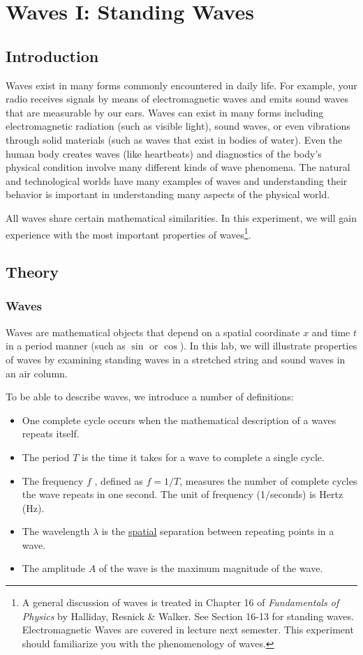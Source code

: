  \chapter{Waves I: Standing Waves}
\label{chap:waves}
\section{Introduction}
Waves exist in many forms commonly encountered in daily life. For example, your radio receives signals by means of electromagnetic waves and emits sound waves that are measurable by our ears. Waves can exist in many forms including electromagnetic radiation (such as visible light), sound waves, or even vibrations through solid materials (such as waves that exist in bodies of water). Even the human body creates waves (like heartbeats) and diagnostics of the body's physical condition involve many different kinds of wave phenomena. The natural and technological worlds have many examples of waves and understanding their behavior is important in understanding many aspects of the physical world. \myskip

All waves share certain mathematical similarities. In this experiment, we will gain experience with the most important properties of waves\footnote{A general discussion of waves is treated in Chapter 16 of \emph{Fundamentals of Physics} by Halliday, Resnick \& Walker. See Section 16-13 for standing waves. Electromagnetic Waves are covered in lecture next semester. This experiment should familiarize you with the phenomenology of waves.}.

\section{Theory}
\subsection{Waves}
Waves are mathematical objects that depend on a spatial coordinate $x$ and time $t$ in a period manner (such as $\sin$ or $\cos$). In this lab, we will illustrate properties of waves by examining standing waves in a stretched string and sound waves in an air column. \myskip

To be able to describe waves, we introduce a number of definitions:
\begin{itemize}
\item One complete cycle occurs when the mathematical description of a waves repeats itself.
\item The period $T$ is the time it takes for a wave to complete a single cycle.
\item The frequency $f$ , defined as $f = 1/T$, measures the number of complete cycles the wave repeats in one second. The unit of frequency (1/seconds) is Hertz (Hz).
\item The wavelength $\lambda$ is the \underline{spatial} separation between repeating points in a wave.
\item The amplitude $A$ of the wave is the maximum magnitude of the wave.
\end{itemize}

